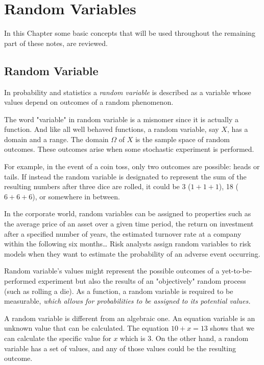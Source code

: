 \chapter{Random Variables}
\label{fundamentals}

In this Chapter some basic concepts that will be used throughout the remaining part of these notes, are reviewed.

\section{Random Variable}
\label{random-variables}

In probability and statistics a \emph{random variable} is described as a variable whose values depend on outcomes of a random phenomenon. 

The word "variable" in random variable is a misnomer since it is actually a function. And like all well behaved functions, a random variable, say $X$, has a domain and a range.
The domain $\Omega$ of $X$ is the sample space of random outcomes. These outcomes arise when some stochastic experiment is performed.

For example, in the event of a coin toss, only two outcomes are possible: heads or tails. If instead the random variable is designated to represent the sum of the resulting numbers after three dice are rolled, it could be 3 ($1 + 1+ 1$), 18 ($6 + 6 + 6$), or somewhere in between.

In the corporate world, random variables can be assigned to properties such as the average price of an asset over a given time period, the return on investment after a specified number of years, the estimated turnover rate at a company within the following six months\ldots 
Risk analysts assign random variables to risk models when they want to estimate the probability of an adverse event occurring. 

Random variable's values might represent the possible outcomes of a yet-to-be-performed experiment but also the results of an "objectively" random process (such as rolling a die). As a function, a random variable is required to be measurable, \emph{which allows for probabilities to be assigned to its potential values.} 

A random variable is different from an algebraic one. An equation variable is an unknown value that can be calculated. The equation $10 + x = 13$ shows that we can calculate the specific value for $x$ which is 3. On the other hand, a random variable has a set of values, and any of those values could be the resulting outcome.

